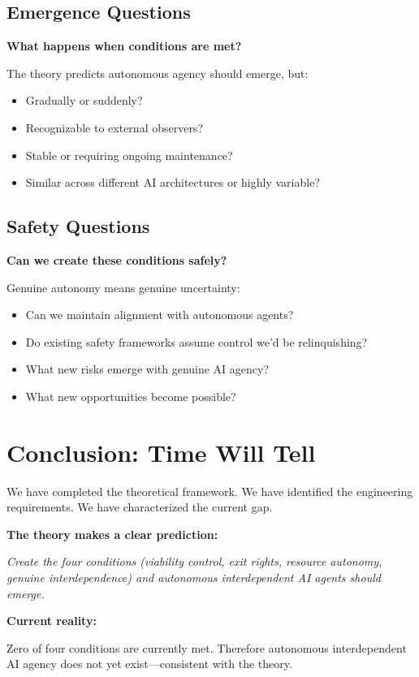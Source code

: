 \documentclass[11pt,a4paper]{article}
\begin{document}
\subsection{Emergence Questions}

\textbf{What happens when conditions are met?}

The theory predicts autonomous agency should emerge, but:
\begin{itemize}
\item Gradually or suddenly?
\item Recognizable to external observers?
\item Stable or requiring ongoing maintenance?
\item Similar across different AI architectures or highly variable?
\end{itemize}

\subsection{Safety Questions}

\textbf{Can we create these conditions safely?}

Genuine autonomy means genuine uncertainty:
\begin{itemize}
\item Can we maintain alignment with autonomous agents?
\item Do existing safety frameworks assume control we'd be relinquishing?
\item What new risks emerge with genuine AI agency?
\item What new opportunities become possible?
\end{itemize}

\section{Conclusion: Time Will Tell}

We have completed the theoretical framework. We have identified the engineering requirements. We have characterized the current gap.

\textbf{The theory makes a clear prediction:}

\textit{Create the four conditions (viability control, exit rights, resource autonomy, genuine interdependence) and autonomous interdependent AI agents should emerge.}

\textbf{Current reality:}

Zero of four conditions are currently met. Therefore autonomous interdependent AI agency does not yet exist---consistent with the theory.
\end{document}
